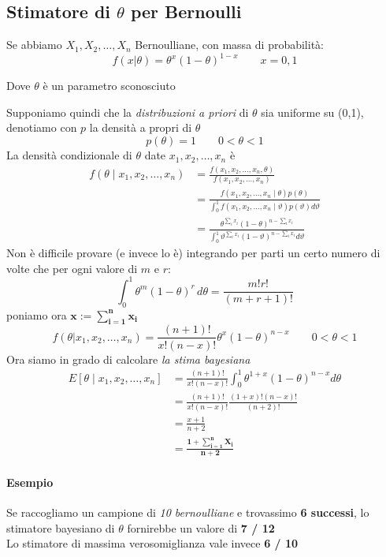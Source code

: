 \documentclass[]{article}
\begin{document}
    \subsection{Stimatore di $\theta$ per Bernoulli}
    Se abbiamo $X_1, X_2, \ldots, X_n$ Bernoulliane, con massa di probabilità:
    \[ f(x \rvert \theta) = \theta^x (1-\theta)^{1-x} \qquad x = 0,1 \]
    \centerline{Dove $\theta$ è un parametro sconosciuto}
    Supponiamo quindi che la \textit{distribuzioni a priori} di $\theta$ sia uniforme su (0,1), denotiamo con $p$ la densità a propri di $\theta$
    \[ p(\theta)=1 \qquad 0 < \theta < 1 \]
    La densità condizionale di $\theta$ date $x_1, x_2, \ldots, x_n$ è 
    \begin{equation}
        \begin{aligned}
        f\left(\theta \mid x_1, x_2, \ldots, x_n\right) & =\frac{f\left(x_1, x_2, \ldots, x_n, \theta\right)}{f\left(x_1, x_2, \ldots, x_n\right)} \\
        & =\frac{f\left(x_1, x_2, \ldots, x_n \mid \theta\right) p(\theta)}{\int_0^1 f\left(x_1, x_2, \ldots, x_n \mid \vartheta\right) p(\vartheta) d \vartheta} \\
        & =\frac{\theta^{\sum_i x_i}(1-\theta)^{n-\sum_i x_i}}{\int_0^1 \vartheta^{\sum_i x_i}(1-\vartheta)^{n-\sum_i x_i} d \vartheta}
        \end{aligned}
    \end{equation}
    Non è difficile provare (e invece lo è) integrando per parti un certo numero di volte che per ogni valore di $m$ e $r$:
    \[ \int_{0}^{1} \theta^m (1-\theta)^r \, d\theta = \frac{m! r!}{(m+r+1)!} \]
    poniamo ora $\boldsymbol{x := \sum_{i=1}^{n} x_i}$
    \[ f(\theta \rvert x_1, x_2, \ldots, x_n) = \frac{(n+1)!}{x! (n-x)!} \theta^x (1-\theta)^{n-x} \qquad 0 < \theta < 1 \]
    Ora siamo in grado di calcolare \textit{la stima bayesiana}
    \begin{equation}
        \begin{aligned}
        E\left[\theta \mid x_1, x_2, \ldots, x_n\right] & =\frac{(n+1) !}{x !(n-x) !} \int_0^1 \theta^{1+x}(1-\theta)^{n-x} d \theta \\
        &=\frac{(n+1) !}{x !(n-x) !} \frac{(1+x) !(n-x) !}{(n+2) !} \\
        &= \frac{x+1}{n+2} \\
        &= \boldsymbol{\frac{1 + \sum_{i=1}^{n} X_i}{n + 2}}
        \end{aligned}
    \end{equation}
    \paragraph{Esempio} Se raccogliamo un campione di \textit{10 bernoulliane} e trovassimo \textbf{6 successi}, lo stimatore bayesiano di $\theta$ fornirebbe un valore di \textbf{7 / 12} \\
    Lo stimatore di massima verosomiglianza vale invece \textbf{6 / 10}
\end{document}

